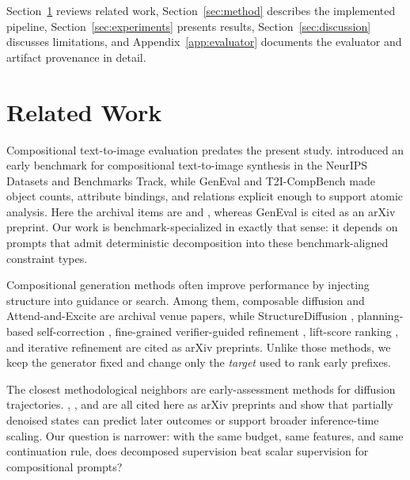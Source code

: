\documentclass{article}
\begin{document}
Section~\ref{sec:related} reviews related work, Section~\ref{sec:method} describes the implemented pipeline, Section~\ref{sec:experiments} presents results, Section~\ref{sec:discussion} discusses limitations, and Appendix~\ref{app:evaluator} documents the evaluator and artifact provenance in detail.

\section{Related Work}
\label{sec:related}
Compositional text-to-image evaluation predates the present study. \citet{park2021benchmarkcompositional} introduced an early benchmark for compositional text-to-image synthesis in the NeurIPS Datasets and Benchmarks Track, while GenEval \citep{ghosh2023genevalobjectfocusedframeworkevaluating} and T2I-CompBench \citep{huang2023t2icompbenchcomprehensivebenchmark} made object counts, attribute bindings, and relations explicit enough to support atomic analysis. Here the archival items are \citet{park2021benchmarkcompositional} and \citet{huang2023t2icompbenchcomprehensivebenchmark}, whereas GenEval is cited as an arXiv preprint. Our work is benchmark-specialized in exactly that sense: it depends on prompts that admit deterministic decomposition into these benchmark-aligned constraint types.

Compositional generation methods often improve performance by injecting structure into guidance or search. Among them, composable diffusion \citep{liu2022compositionalvisual} and Attend-and-Excite \citep{chefer2023attendexcite} are archival venue papers, while StructureDiffusion \citep{feng2022trainingfreestructureddiffusionguidance}, planning-based self-correction \citep{wang2024divideconquerlanguagemodels}, fine-grained verifier-guided refinement \citep{izadi2025finegrainedalignmentnoiserefinement}, lift-score ranking \citep{yu2025improvingcompositionalgenerationdiffusion}, and iterative refinement \citep{jaiswal2026iterativerefinementimprovescompositional} are cited as arXiv preprints. Unlike those methods, we keep the generator fixed and change only the \emph{target} used to rank early prefixes.

The closest methodological neighbors are early-assessment methods for diffusion trajectories. \citet{guo2026earlyqualityassessmenttexttoimage}, \citet{cui2026diffusionprobegeneratedimage}, and \citet{ma2025inferencetimescalingdiffusionmodels} are all cited here as arXiv preprints and show that partially denoised states can predict later outcomes or support broader inference-time scaling. Our question is narrower: with the same budget, same features, and same continuation rule, does decomposed supervision beat scalar supervision for compositional prompts?
\end{document}
